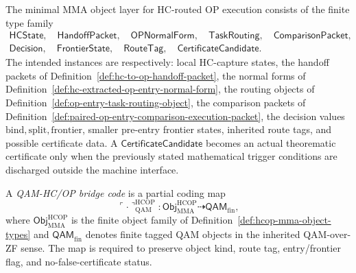 \begin{definition}
\label{def:hcop-mma-object-types}
The minimal MMA object layer for HC-routed OP execution consists of the finite type family
\[
\begin{aligned}
  \mathsf{HCState},\quad
  \mathsf{HandoffPacket},\quad
  \mathsf{OPNormalForm},\quad
  \mathsf{TaskRouting},\quad
  \mathsf{ComparisonPacket},\\
  \mathsf{Decision},\quad
  \mathsf{FrontierState},\quad
  \mathsf{RouteTag},\quad
  \mathsf{CertificateCandidate}.
\end{aligned}
\]
The intended instances are respectively: local HC-capture states, the handoff packets of Definition~\ref{def:hc-to-op-handoff-packet}, the normal forms of Definition~\ref{def:hc-extracted-op-entry-normal-form}, the routing objects of Definition~\ref{def:op-entry-task-routing-object}, the comparison packets of Definition~\ref{def:paired-op-entry-comparison-execution-packet}, the decision values \(\mathrm{bind},\mathrm{split},\mathrm{frontier}\), smaller pre-entry frontier states, inherited route tags, and possible certificate data. A \(\mathsf{CertificateCandidate}\) becomes an actual theorematic certificate only when the previously stated mathematical trigger conditions are discharged outside the machine interface.
\end{definition}

\begin{definition}
\label{def:qam-coding-bridge-for-hcop-objects}
A \emph{QAM-HC/OP bridge code} is a partial coding map
\[
  \ulcorner\cdot\urcorner_{\mathrm{QAM}}^{\mathrm{HCOP}}
  :
  \mathsf{Obj}_{\mathrm{MMA}}^{\mathrm{HCOP}}
  \dashrightarrow
  \mathsf{QAM}_{\mathrm{fin}},
\]
where \(\mathsf{Obj}_{\mathrm{MMA}}^{\mathrm{HCOP}}\) is the finite object family of Definition~\ref{def:hcop-mma-object-types} and \(\mathsf{QAM}_{\mathrm{fin}}\) denotes finite tagged QAM objects in the inherited QAM-over-ZF sense. The map is required to preserve object kind, route tag, entry/frontier flag, and no-false-certificate status.
\end{definition}


